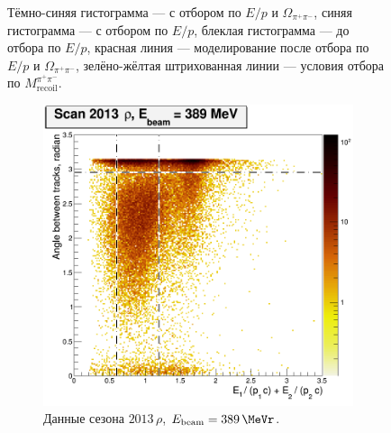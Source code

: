 \begin{figure}
\begin{minipage}[t]{0.45\textwidth}
        \caption{Тёмно-синяя гистограмма --- с отбором по $E/p$ и $\Omega_{\pi^+ \pi^-}$,
            синяя гистограмма --- с отбором по $E/p$,
            блеклая гистограмма --- до отбора по $E/p$,
            красная линия --- моделирование после отбора по $E/p$ и $\Omega_{\pi^+ \pi^-}$,
            зелёно-жёлтая штрихованная линии --- условия отбора по $M_{\text{recoil}}^{\pi^+ \pi^-}$.}
        \label{fig:3pi_mpipi}
  \end{minipage}
\end{figure}


\begin{figure}[htbp]
    \centering
    \begin{subfigure}[b]{0.45\textwidth}
        \includegraphics[width=\textwidth]{img/raskl_vs_sumEP_rho389.png}
        \caption{Данные сезона $2013 \, \rho$, $E_{\text{beam}} = \SI{389}{\MeVr}$.}
        \label{fig:3pi_raskl_rho389}
    \end{subfigure}
    ~
    \begin{subfigure}[b]{0.45\textwidth}

\end{subfigure}
\end{figure}
